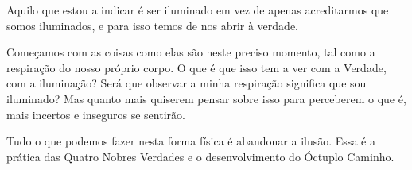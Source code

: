 Aquilo que estou a indicar é ser iluminado em vez de apenas acreditarmos que
somos iluminados, e para isso temos de nos abrir à verdade.

Começamos com as coisas como elas são neste preciso momento, tal como a
respiração do nosso próprio corpo. O que é que isso tem a ver com a Verdade, com
a iluminação? Será que observar a minha respiração significa que sou iluminado?
Mas quanto mais quiserem pensar sobre isso para perceberem o que é, mais
incertos e inseguros se sentirão.

Tudo o que podemos fazer nesta forma física é abandonar a ilusão. Essa é a
prática das Quatro Nobres Verdades e o desenvolvimento do Óctuplo Caminho.

